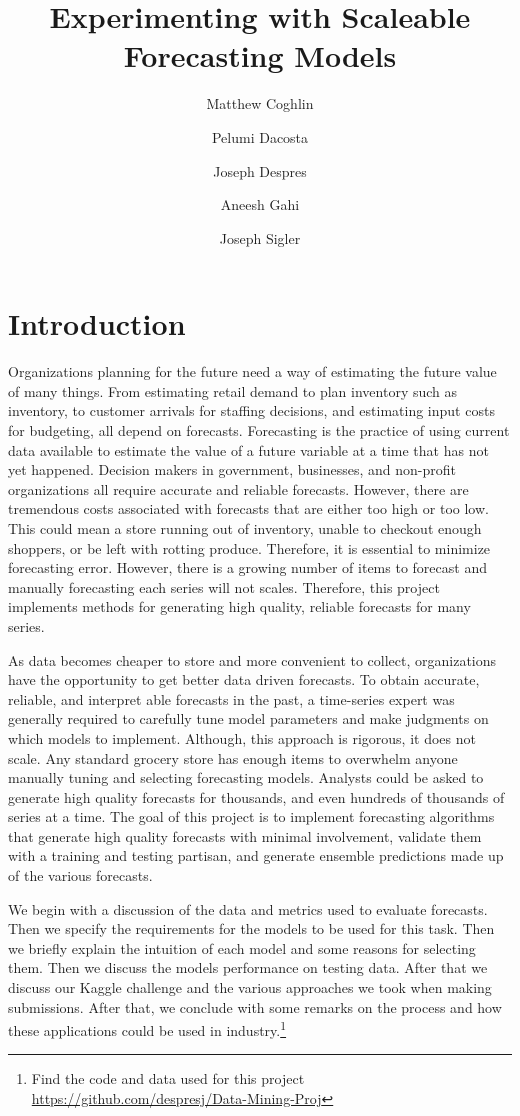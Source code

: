 \documentclass[16pt,twocolumn,letterpaper]{article}
\title{Experimenting with Scaleable Forecasting Models}
\author{
    Matthew Coghlin\\
  	\and
  	Pelumi Dacosta\\
    \and
    Joseph Despres\\
    \and
    Aneesh Gahi\\
    \and
    Joseph Sigler\\
}
\begin{document}
\maketitle



\section{Introduction}

Organizations planning for the future need a way of estimating the future value of many things. From estimating retail demand to plan inventory such as inventory, to customer arrivals for staffing decisions, and estimating input costs for budgeting, all depend on forecasts. Forecasting is the practice of using current data available to estimate the value of a future variable at a time that has not yet happened. Decision makers in government, businesses, and non-profit organizations all require accurate and reliable forecasts. However, there are tremendous costs associated with forecasts that are either too high or too low. This could mean a store running out of inventory, unable to checkout enough shoppers, or be left with rotting produce. Therefore, it is essential to minimize forecasting error. However, there is a growing number of items to forecast and manually forecasting each series will not scales. Therefore, this project implements methods for generating high quality, reliable forecasts for many series. 

As data becomes cheaper to store and more convenient to collect, organizations have the opportunity to get better data driven forecasts. To obtain accurate, reliable, and interpret able forecasts in the past, a time-series expert was generally required to carefully tune model parameters \cite{taylor2018forecasting} and make judgments on which models to implement. Although, this approach is rigorous, it does not scale. Any standard grocery store has enough items to overwhelm anyone manually tuning and selecting forecasting models. Analysts could be asked to generate high quality forecasts for thousands, and even hundreds of thousands of series at a time. The goal of this project is to implement forecasting algorithms that generate high quality forecasts with minimal involvement, validate them with a training and testing partisan, and generate ensemble predictions made up of the various forecasts.

We begin with a discussion of the data and metrics used to evaluate forecasts. Then we specify the requirements for the models to be used for this task. Then we briefly explain the intuition of each model and some reasons for selecting them. Then we discuss the models performance on testing data. After that we discuss our Kaggle challenge and the various approaches we took when making submissions. After that, we conclude with some remarks on the process and how these applications could be used in industry.\footnote{Find the code and data used for this project \url{https://github.com/despresj/Data-Mining-Proj}  } 
\end{document}
